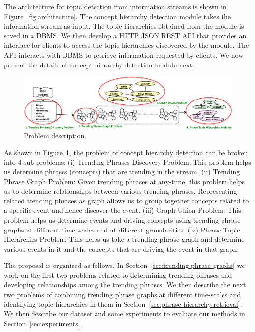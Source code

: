 \documentclass{sig-alternate}
\begin{document}
The architecture for topic detection from information streams is shown in Figure~\ref{fig:architecture}. The concept hierarchy detection module takes the information stream as input. The topic hierarchies obtained from the module is saved in a DBMS. We then develop a HTTP JSON REST API that provides an interface for clients to access the topic hierarchies discovered by the module. The API interacts with DBMS to retrieve information requested by clients. We now present the details of concept hierarchy detection module next.

\begin{figure}[!t]
\begin{center}
\includegraphics[width=7in]{images/introduction}
\caption{Problem description.}
\label{fig:introduction}
\end{center}
\end{figure}

As shown in Figure~\ref{fig:introduction}, the problem of concept hierarchy detection can be broken into 4 sub-problems: (i) Trending Phrases Discovery Problem: This problem helps us determine phrases (concepts) that are trending in the stream. (ii) Trending Phrase Graph Problem: Given trending phrases at any-time, this problem helps us to determine relationships between various trending phrases. Representing related trending phrases as graph allows us to group together concepts related to a specific event and hence discover the event. (iii) Graph Union Problem: This problem helps us determine events and driving concepts using trending phrase graphs at different time-scales and at different granularities. (iv) Phrase Topic Hierarchies Problem: This helps us take a trending phrase graph and determine various events in it and the concepts that are driving the event in that graph.

The proposal is organized as follows. In Section~\ref{sec:trending-phrase-graphs} we work on the first two problems related to determining trending phrases and developing relationships among the trending phrases. We then describe the next two problems of combining trending phrase graphs at different time-scales and identifying topic hierarchies in them in Section~\ref{sec:phrase-hierarchy-retrieval}. We then describe our dataset and some experiments to evaluate our methods in Section~\ref{sec:experiments}.
\end{document}
